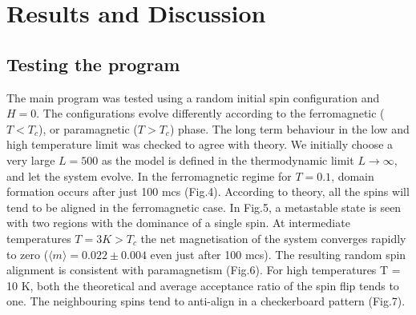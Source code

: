 \documentclass[a4paper]{article}
\begin{document}
 
\section{Results and Discussion}
\subsection{Testing the program}

The main program was tested using a random initial spin configuration and $H = 0$. The configurations evolve differently according to the ferromagnetic ($T < T_c$), or paramagnetic ($T > T_c$) phase. The long term behaviour in the low and high temperature limit was checked to agree with theory. We initially choose a very large $L = 500$ as the model is defined in the thermodynamic limit $L \rightarrow \infty$, and let the system evolve. In the ferromagnetic regime for $T = 0.1$, domain formation occurs after just 100 mcs (Fig.4). According to theory, all the spins will tend to be aligned in the ferromagnetic case. In Fig.5, a metastable state is seen with two  regions with the dominance of a single spin. At intermediate temperatures $T = 3K > T_c$ the net magnetisation of the system converges rapidly to zero ($\langle m \rangle = 0.022 \pm 0.004$ even just after 100 mcs). The resulting random spin alignment is consistent with paramagnetism (Fig.6). For high temperatures T = 10 K, both the theoretical and average acceptance ratio of the spin flip tends to one. The neighbouring spins tend to anti-align in a checkerboard pattern (Fig.7). 

\vspace{3mm}
\end{document}
